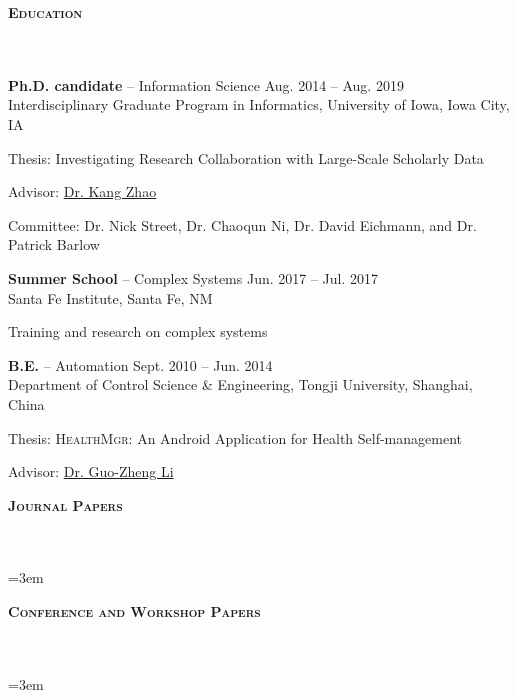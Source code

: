 \documentclass{article}
\newcommand{\header}[1]{{
\hspace*{-15pt}\vspace*{6pt} \textbf{\textsc{\large{#1}}}} \vspace*{-6pt} 
\lineunder
}
\newcommand{\lineunder}{
\vspace*{-8pt} \\ \hspace*{-15pt} 
\hrulefill \\
}
\newcommand{\employer}[4]{{
\vspace*{2pt}%
\textbf{#1} #2 \hfill #3\\ #4 \vspace*{2pt}}
}
\renewcommand{\labelitemii}{
$\vcenter{\hbox{\tiny$\bullet$}}$\hspace*{-3pt}
}
\newenvironment{bullet-list-minor}{
\begin{list}{\labelitemii}{\setlength\leftmargin{15pt} 
\topsep 0pt \itemsep -2pt}}{\vspace*{4pt}\end{list}
}
\begin{document}
   
\vspace*{4pt}%
\header{Education}
    \employer{Ph.D. candidate}{-- Information Science}{Aug. 2014 -- Aug. 2019}{Interdisciplinary Graduate Program in Informatics, University of Iowa, Iowa City, IA}
	\begin{bullet-list-minor}
    	\item Thesis: Investigating Research Collaboration with Large-Scale Scholarly Data
        \item Advisor: \href{www.kangzhao.net}{Dr. Kang Zhao}
        \item Committee: Dr. Nick Street, Dr. Chaoqun Ni, Dr. David Eichmann, and Dr. Patrick Barlow
    \end{bullet-list-minor}
    
    \employer{Summer School}{-- Complex Systems}{Jun. 2017 -- Jul. 2017}{Santa Fe Institute, Santa Fe, NM}
	\begin{bullet-list-minor}
    	\item Training and research on complex systems
    \end{bullet-list-minor}
    
    \employer{B.E.}{-- Automation}{Sept. 2010 -- Jun. 2014}{Department of Control Science \& Engineering, Tongji University, Shanghai, China}
	\begin{bullet-list-minor}
    	\item Thesis: \textsc{HealthMgr}: An Android Application for Health Self-management
        \item Advisor: \href{http://www.ndctcm.cn/gzli/}{Dr. Guo-Zheng Li}
    \end{bullet-list-minor}
    
\vspace*{4pt}%
\header{Journal Papers}

\nocite{*}
\newrefcontext[labelprefix=J]
\emergencystretch=3em
\printbibliography[heading=none,keyword={J}] 

\vspace*{4pt}%
\header{Conference and Workshop Papers}

\nocite{*}
\newrefcontext[labelprefix=C]
\emergencystretch=3em
\printbibliography[keyword={C},heading=none] 
\end{document}

